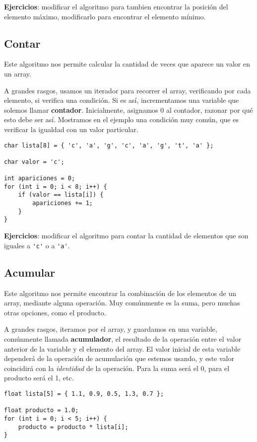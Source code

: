 \documentclass[10pt]{article}
\begin{document}
\textbf{Ejercicios}: modificar el algoritmo para tambien encontrar la posición del elemento máximo, modificarlo para encontrar el elemento mínimo.

\subsection{Contar}

Este algoritmo nos permite calcular la cantidad de veces que aparece un valor en un array.

\bigskip

A grandes rasgos, usamos un iterador para recorrer el array, verificando por cada elemento, si verifica una condición. Si es así, incrementamos una variable que solemos llamar \textbf{contador}. Inicialmente, asignamos 0 al contador, razonar por qué esto debe ser así. Mostramos en el ejemplo una condición muy común, que es verificar la igualdad con un valor particular.

\begin{lstlisting}
char lista[8] = { 'c', 'a', 'g', 'c', 'a', 'g', 't', 'a' };

char valor = 'c';

int apariciones = 0;
for (int i = 0; i < 8; i++) {
	if (valor == lista[i]) {
		apariciones += 1;
	}
}
\end{lstlisting}

\textbf{Ejercicios}: modificar el algoritmo para contar la cantidad de elementos que son iguales a \lstinline{'c'} o a \lstinline{'a'}.

\subsection{Acumular}

Este algoritmo nos permite encontrar la combinación de los elementos de un array, mediante alguna operación. Muy comúnmente es la suma, pero muchas otras opciones, como el producto.

\bigskip

A grandes rasgos, iteramos por el array, y guardamos en una variable, comúnmente llamada \textbf{acumulador}, el resultado de la operación entre el valor anterior de la variable y el elemento del array. El valor inicial de esta variable dependerá de la operación de acumulación que estemos usando, y este valor coincidirá con la \textit{identidad} de la operación. Para la suma será el 0, para el producto será el 1, etc.

\begin{lstlisting}
float lista[5] = { 1.1, 0.9, 0.5, 1.3, 0.7 };

float producto = 1.0;
for (int i = 0; i < 5; i++) {
	producto = producto * lista[i];
}
\end{lstlisting}
\end{document}
